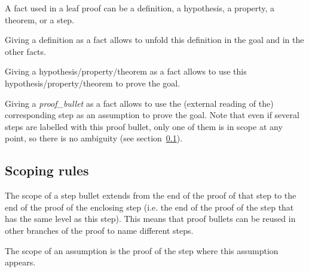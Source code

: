 
A fact used in a leaf proof can be a definition, a hypothesis, a
property, a theorem, or a step.

Giving a definition as a fact allows \zenon{} to unfold this
definition in the goal and in the other facts.

Giving a hypothesis/property/theorem as a fact allows \zenon{} to use
this hypothesis/property/theorem to prove the goal.

Giving a {\em proof\_bullet} as a fact allows \zenon{} to use the
(external reading of the) corresponding step as an assumption to prove
the goal.  Note that even if several steps are labelled with this
proof bullet, only one of them is in scope at any point, so there is
no ambiguity (see section~\ref{sec:scoping}).

\subsection{Scoping rules}\label{sec:scoping}

The scope of a step bullet extends from the end of the proof of that
step to the end of the proof of the enclosing step (i.e. the end of
the proof of the  step that has the same level as this
step).  This means that proof bullets can be reused in other branches
of the proof to name different steps.

The scope of an assumption is the proof of the step where this
assumption appears.
